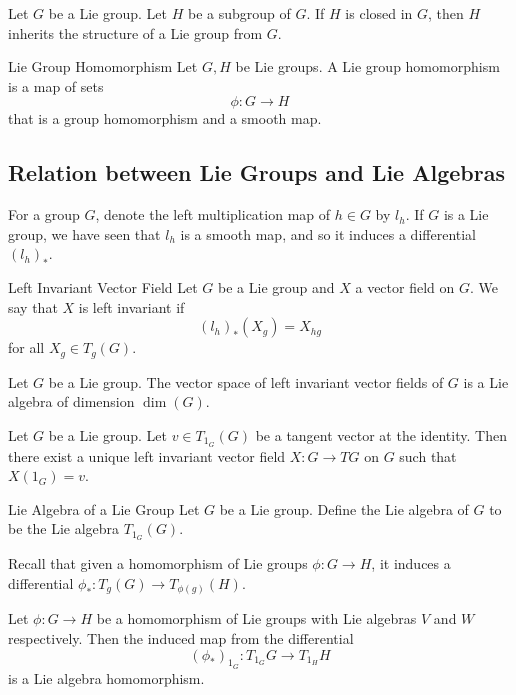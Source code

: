 \documentclass[a4paper]{article}
\begin{document}
\begin{prp}{}{} Let $G$ be a Lie group. Let $H$ be a subgroup of $G$. If $H$ is closed in $G$, then $H$ inherits the structure of a Lie group from $G$. 
\end{prp}

\begin{defn}{Lie Group Homomorphism}{} Let $G,H$ be Lie groups. A Lie group homomorphism is a map of sets $$\phi:G\to H$$ that is a group homomorphism and a smooth map. 
\end{defn}

\subsection{Relation between Lie Groups and Lie Algebras}
For a group $G$, denote the left multiplication map of $h\in G$ by $l_h$. If $G$ is a Lie group, we have seen that $l_h$ is a smooth map, and so it induces a differential $(l_h)_\ast$. 

\begin{defn}{Left Invariant Vector Field}{} Let $G$ be a Lie group and $X$ a vector field on $G$. We say that $X$ is left invariant if $$(l_h)_\ast(X_g)=X_{hg}$$ for all $X_g\in T_g(G)$. 
\end{defn}

\begin{prp}{}{} Let $G$ be a Lie group. The vector space of left invariant vector fields of $G$ is a Lie algebra of dimension $\dim(G)$. 
\end{prp}

\begin{prp}{}{} Let $G$ be a Lie group. Let $v\in T_{1_G}(G)$ be a tangent vector at the identity. Then there exist a unique left invariant vector field $X:G\to TG$ on $G$ such that $X({1_G})=v$. 
\end{prp}

\begin{defn}{Lie Algebra of a Lie Group}{} Let $G$ be a Lie group. Define the Lie algebra of $G$ to be the Lie algebra $T_{1_G}(G)$. 
\end{defn}

Recall that given a homomorphism of Lie groups $\phi:G\to H$, it induces a differential $\phi_\ast:T_g(G)\to T_{\phi(g)}(H)$. 

\begin{prp}{}{} Let $\phi:G\to H$ be a homomorphism of Lie groups with Lie algebras $V$ and $W$ respectively. Then the induced map from the differential $$(\phi_\ast)_{1_G}:T_{1_G}G\to T_{1_H}H$$ is a Lie algebra homomorphism. 
\end{prp}
\end{document}
